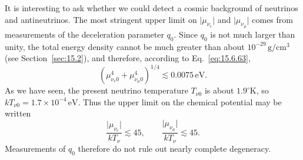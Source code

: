 It is interesting to ask whether we could detect a cosmic background of
neutrinos and antineutrinos. The most stringent upper limit on
\(\lvert\mu_{\nu_e}\rvert\) and \(\lvert\mu_{\nu_\mu}\rvert\) comes from
measurements of the deceleration parameter \(q_0\). Since \(q_0\) is not much
larger than unity, the total energy density cannot be much greater than about
\(10^{-29}\,\mathrm{g/cm^3}\) (see Section~\ref{sec:15.2}), and therefore,
according to Eq.~\eqref{eq:15.6.63},
\begin{equation}
  (\mu_{\nu_e0}^4+\mu_{\nu_\mu0}^4)^{1/4}
  \lesssim
  0.0075\,\mathrm{eV}.
  \tag{15.6.64}\label{eq:15.6.64}
\end{equation}
As we have seen, the present neutrino temperature \(T_{\nu0}\) is about
\(1.9^\circ\mathrm K\), so \(kT_{\nu0}=1.7\times10^{-4}\,\mathrm{eV}\).
Thus the upper limit on the chemical potential may be written
\begin{equation}
  \frac{\lvert\mu_{\nu_e}\rvert}{kT_\nu}\lesssim45,
  \qquad
  \frac{\lvert\mu_{\nu_\mu}\rvert}{kT_\nu}\lesssim45.
  \tag{15.6.65}\label{eq:15.6.65}
\end{equation}
Measurements of \(q_0\) therefore do not rule out nearly complete degeneracy.

